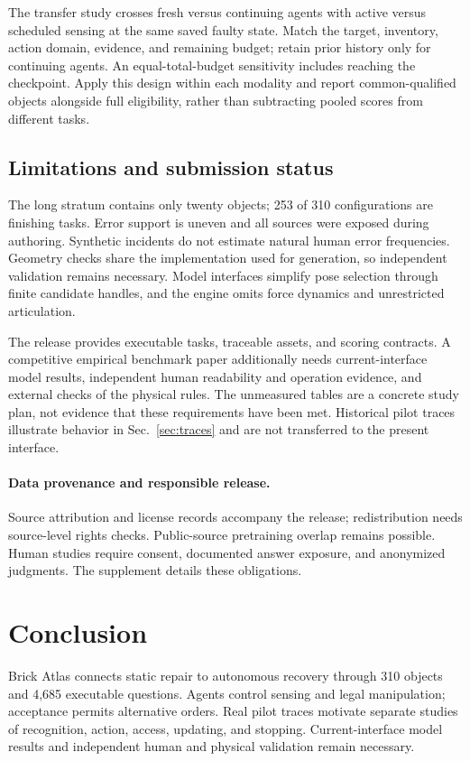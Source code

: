 \documentclass[10pt,twocolumn,letterpaper]{article}
\newcommand{\ours}{Brick Atlas\xspace}\newcommand{\sig}{\sigma}
\begin{document}
The transfer study crosses fresh versus continuing agents with active versus scheduled sensing at the same saved faulty state. Match the target, inventory, action domain, evidence, and remaining budget; retain prior history only for continuing agents. An equal-total-budget sensitivity includes reaching the checkpoint. Apply this design within each modality and report common-qualified objects alongside full eligibility, rather than subtracting pooled scores from different tasks.

\subsection{Limitations and submission status}
The long stratum contains only twenty objects; 253 of 310 configurations are finishing tasks. Error support is uneven and all sources were exposed during authoring. Synthetic incidents do not estimate natural human error frequencies. Geometry checks share the implementation used for generation, so independent validation remains necessary. Model interfaces simplify pose selection through finite candidate handles, and the engine omits force dynamics and unrestricted articulation.

The release provides executable tasks, traceable assets, and scoring contracts. A competitive empirical benchmark paper additionally needs current-interface model results, independent human readability and operation evidence, and external checks of the physical rules. The unmeasured tables are a concrete study plan, not evidence that these requirements have been met. Historical pilot traces illustrate behavior in Sec.~\ref{sec:traces} and are not transferred to the present interface.

\paragraph{Data provenance and responsible release.}
Source attribution and license records accompany the release; redistribution needs source-level rights checks. Public-source pretraining overlap remains possible. Human studies require consent, documented answer exposure, and anonymized judgments. The supplement details these obligations.

\section{Conclusion}
\ours connects static repair to autonomous recovery through 310 objects and 4,685 executable questions. Agents control sensing and legal manipulation; acceptance permits alternative orders. Real pilot traces motivate separate studies of recognition, action, access, updating, and stopping. Current-interface model results and independent human and physical validation remain necessary.

\clearpage
{\small}
\end{document}
